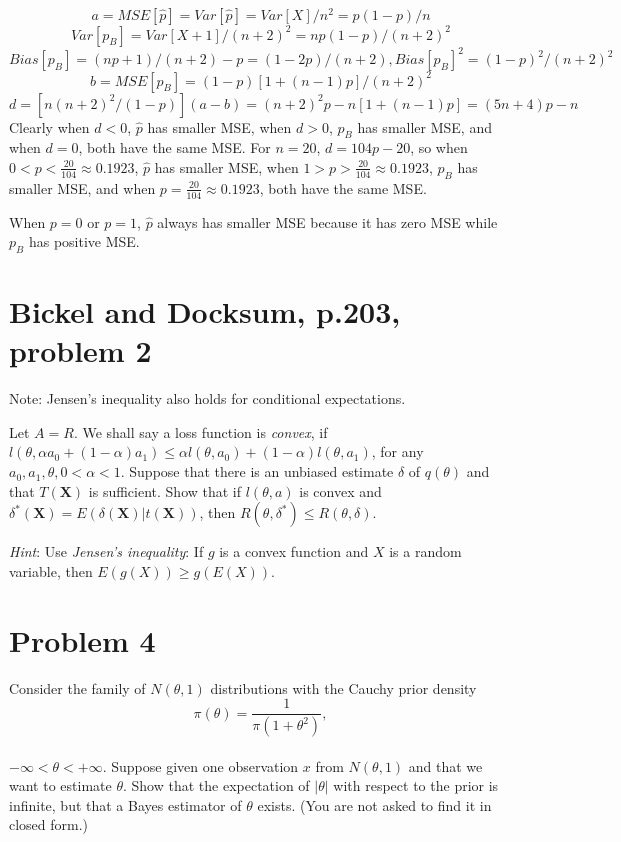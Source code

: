 \documentclass[11pt]{article}
\newcommand{\ProbS}{\iftrue}
\newcommand{\ProbE}{\fi}
\begin{document}
$$
a = MSE[\hat{p}] = Var[\hat{p}] = Var[X] / n^2 = p(1-p)/n
$$
$$
Var[{p}_B] = Var[X+1] / (n+2)^2 = np(1-p)/(n+2)^2
$$
$$
Bias[{p}_B] = (np+1)/(n+2)-p
= (1-2p)/(n+2),
Bias[{p}_B]^2 = (1-p)^2/(n+2)^2
$$
$$
b = MSE[{p}_B] = (1-p)[1+(n-1)p]/(n+2)^2
$$
$$
d = [n(n+2)^2/(1-p)](a-b) = (n+2)^2 p - n[1+(n-1)p]
= (5n+4)p-n
$$
Clearly when $d<0$, $\hat{p}$ has smaller MSE,
when $d>0$, $p_B$ has smaller MSE,
and when $d=0$, both have the same MSE.
For $n=20$, $d=104p-20$, so
when $0<p<\frac{20}{104} \approx 0.1923$, $\hat{p}$ has smaller MSE,
when $1>p>\frac{20}{104} \approx 0.1923$, $p_B$ has smaller MSE,
and when $p=\frac{20}{104} \approx 0.1923$, both have the same MSE.

When $p=0$ or $p=1$, $\hat{p}$ always has smaller MSE because it has zero MSE while $p_B$ has positive MSE.

\section{Bickel and Docksum, p.203, problem 2}
\ProbS
Note: Jensen's inequality also holds for conditional expectations.

Let $A=R$. We shall say a loss function is \emph{convex}, if
$l(\theta, \alpha a_0 + (1-\alpha)a_1) \leq
\alpha l(\theta, a_0) + (1-\alpha)l(\theta, a_1)$,
for any $a_0, a_1, \theta, 0<\alpha<1$.
Suppose that there is an unbiased estimate $\delta$ of $q(\theta)$
and that $T(\mathbf{X})$ is sufficient.
Show that if $l(\theta, a)$ is convex and
$\delta^{*}(\mathbf{X}) = E(\delta(\mathbf{X}) | t(\mathbf{X}))$,
then $R(\theta, \delta^{*}) \leq R(\theta, \delta)$.

\emph{Hint}: Use \emph{Jensen's inequality}: If $g$ is a convex function and $X$ is a random variable, then $E(g(X)) \geq g(E(X))$.
\ProbE

\section{Problem 4}
\ProbS
Consider the family of $N(\theta, 1)$ distributions with the Cauchy prior density
$$
\pi(\theta) = \frac{1}{\pi(1+\theta^2)},
$$
\\
$-\infty < \theta < +\infty$.
Suppose given one observation $x$ from $N(\theta, 1)$
and that we want to estimate $\theta$.
Show that the expectation of $|\theta|$ with respect to the prior is infinite, but that a Bayes estimator of $\theta$ exists.
(You are not asked to find it in closed form.)
\ProbE
\end{document}
